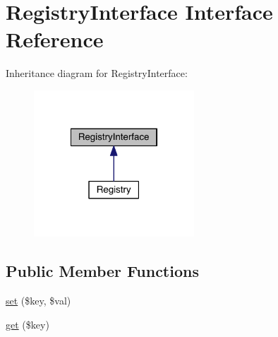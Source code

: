 \hypertarget{interfaceapp_1_1models_1_1core_1_1_registry_interface}{\section{Registry\-Interface Interface Reference}
\label{interfaceapp_1_1models_1_1core_1_1_registry_interface}
}


Inheritance diagram for Registry\-Interface\-:
\nopagebreak
\begin{figure}[H]
\begin{center}
\leavevmode
\includegraphics[width=170pt]{interfaceapp_1_1models_1_1core_1_1_registry_interface__inherit__graph}
\end{center}
\end{figure}
\subsection*{Public Member Functions}
\begin{DoxyCompactItemize}
\item 
\hyperlink{interfaceapp_1_1models_1_1core_1_1_registry_interface_ac8d8012023e560c81f55a629022cb65a}{set} (\$key, \$val)
\item 
\hyperlink{interfaceapp_1_1models_1_1core_1_1_registry_interface_a24a9bf83a1002d46ece83a93d14bd921}{get} (\$key)
\end{DoxyCompactItemize}


